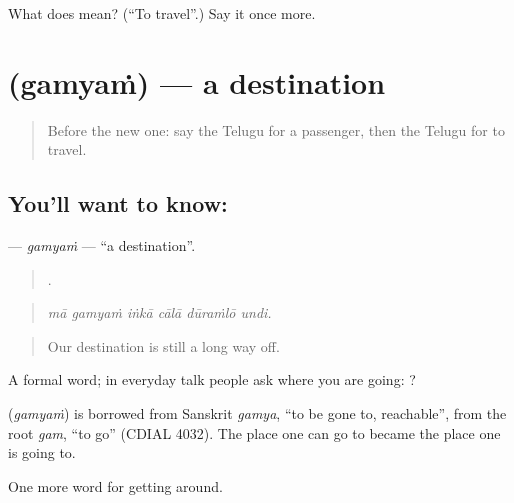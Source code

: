 \begin{tcolorbox}[breakable,colback=teal!4,colframe=teal!35!black,title={Before you move on}]
What does  mean? (\textquotedblleft{}To travel\textquotedblright{}.) Say it once more.
\end{tcolorbox}
\section[\texorpdfstring{\te{గమ్యం} (gamyaṁ)}{గమ్యం (gamyaṁ)}]{ (gamyaṁ) — a destination}

\label{lesson:TE-C438-gamyam}



\begin{quote}
Before the new one: say the Telugu for a passenger, then the Telugu for to travel.
\end{quote}

\subsection*{You'll want to know: }
\textbf{} — \emph{gamyaṁ} — \textquotedblleft{}a destination\textquotedblright{}.

\begin{quote}
     .
\end{quote}

\begin{quote}
\emph{mā gamyaṁ iṅkā cālā dūraṁlō undi.}
\end{quote}

\begin{quote}
Our destination is still a long way off.
\end{quote}

A formal word; in everyday talk people ask where you are going:  ?

\begin{cousinweb}
\textbf{} (\emph{gamyaṁ}) is borrowed from Sanskrit \emph{gamya}, \textquotedblleft{}to be gone to, reachable\textquotedblright{}, from the root \emph{gam}, \textquotedblleft{}to go\textquotedblright{} (CDIAL 4032). The place one can go to became the place one is going to.
\end{cousinweb}

\begin{grammarlens}[title={What you've built}]
One more word for getting around.
\end{grammarlens}

